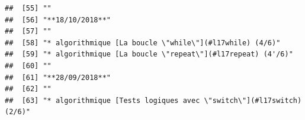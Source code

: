 \documentclass[]{book}
\begin{document}
\begin{verbatim}
##  [55] ""                                                                                                                                                                                                                                                                                                           
##  [56] "**18/10/2018**"                                                                                                                                                                                                                                                                                             
##  [57] ""                                                                                                                                                                                                                                                                                                           
##  [58] "* algorithmique [La boucle \"while\"](#l17while) (4/6)"                                                                                                                                                                                                                                                     
##  [59] "* algorithmique [La boucle \"repeat\"](#l17repeat) (4'/6)"                                                                                                                                                                                                                                                  
##  [60] ""                                                                                                                                                                                                                                                                                                           
##  [61] "**28/09/2018**"                                                                                                                                                                                                                                                                                             
##  [62] ""                                                                                                                                                                                                                                                                                                           
##  [63] "* algorithmique [Tests logiques avec \"switch\"](#l17switch) (2/6)"                                                                                                                                                                                                                                         

\end{verbatim}
\end{document}
